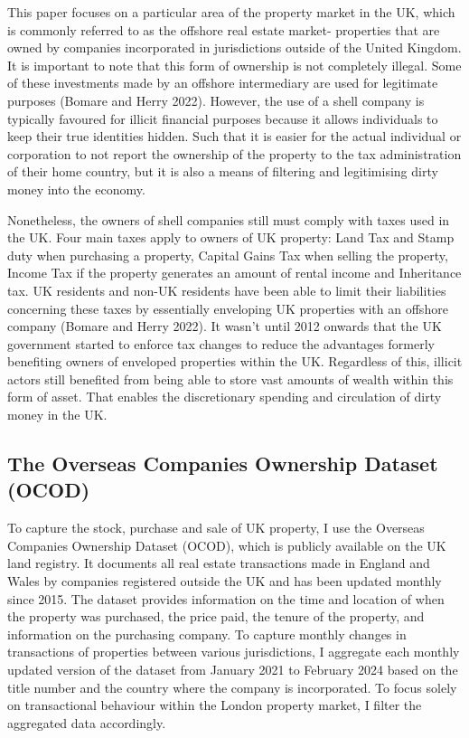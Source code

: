 \documentclass{article}
\begin{document}
This paper focuses on a particular area of the property market in the UK, which is commonly referred to as the offshore real estate market- properties that are owned by companies incorporated in jurisdictions outside of the United Kingdom. It is important to note that this form of ownership is not completely illegal. Some of these investments made by an offshore intermediary are used for legitimate purposes (Bomare and Herry 2022). However, the use of a shell company is typically favoured for illicit financial purposes because it allows individuals to keep their true identities hidden. Such that it is easier for the actual individual or corporation to not report the ownership of the property to the tax administration of their home country, but it is also a means of filtering and legitimising dirty money into the economy. 

Nonetheless, the owners of shell companies still must comply with taxes used in the UK. Four main taxes apply to owners of UK property: Land Tax and Stamp duty when purchasing a property, Capital Gains Tax when selling the property, Income Tax if the property generates an amount of rental income and Inheritance tax. UK residents and non-UK residents have been able to limit their liabilities concerning these taxes by essentially enveloping UK properties with an offshore company (Bomare and Herry 2022). It wasn’t until 2012 onwards that the UK government started to enforce tax changes to reduce the advantages formerly benefiting owners of enveloped properties within the UK. Regardless of this, illicit actors still benefited from being able to store vast amounts of wealth within this form of asset. That enables the discretionary spending and circulation of dirty money in the UK.

\subsection{The Overseas Companies Ownership Dataset (OCOD)}
To capture the stock, purchase and sale of UK property, I use the Overseas Companies Ownership Dataset (OCOD), which is publicly available on the UK land registry. It documents all real estate transactions made in England and Wales by companies registered outside the UK and has been updated monthly since 2015. The dataset provides information on the time and location of when the property was purchased, the price paid, the tenure of the property, and information on the purchasing company. To capture monthly changes in transactions of properties between various jurisdictions, I aggregate each monthly updated version of the dataset from January 2021 to February 2024 based on the title number and the country where the company is incorporated. To focus solely on transactional behaviour within the London property market, I filter the aggregated data accordingly.
\end{document}
